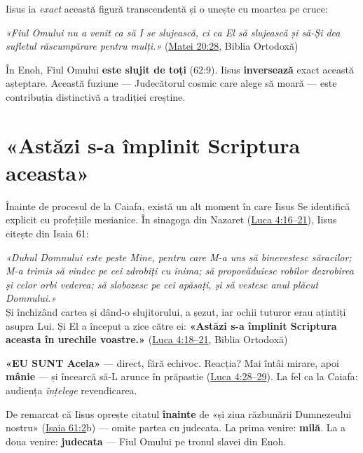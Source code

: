 \documentclass[12pt,a4paper,twoside,openany]{book}
\begin{document}
Iisus ia \textit{exact} această figură transcendentă și o unește cu moartea pe cruce:


\begin{biblequote}
\textit{«Fiul Omului nu a venit ca să I se slujească, ci ca El să slujească și să-Și dea sufletul răscumpărare pentru mulți.»} (\href{https://bibliaortodoxa.ro/carte.php?id=55\&cap=20\#28}{Matei 20:28}, Biblia Ortodoxă)
\end{biblequote}
În Enoh, Fiul Omului \textbf{este slujit de toți} (62:9). Iisus \textbf{inversează} exact această așteptare. Această fuziune — Judecătorul cosmic care alege să moară — este contribuția distinctivă a tradiției creștine.


\chapter{«Astăzi s-a împlinit Scriptura aceasta»}\label{nazaret}
Înainte de procesul de la Caiafa, există un alt moment în care Iisus Se identifică explicit cu profețiile mesianice. În sinagoga din Nazaret (\href{https://bibliaortodoxa.ro/carte.php?id=48\&cap=4\#16}{Luca 4:16–21}), Iisus citește din Isaia 61:


\begin{biblequote}
\textit{«Duhul Domnului este peste Mine, pentru care M-a uns să binevestesc săracilor; M-a trimis să vindec pe cei zdrobiți cu inima; să propovăduiesc robilor dezrobirea și celor orbi vederea; să slobozesc pe cei apăsați, și să vestesc anul plăcut Domnului.»} \\

Și închizând cartea și dând-o slujitorului, a șezut, iar ochii tuturor erau ațintiți asupra Lui. Și El a început a zice către ei: \textbf{«Astăzi s-a împlinit Scriptura aceasta în urechile voastre.»} (\href{https://bibliaortodoxa.ro/carte.php?id=48\&cap=4\#18}{Luca 4:18–21}, Biblia Ortodoxă)
\end{biblequote}
\textbf{«EU SUNT Acela»} — direct, fără echivoc. Reacția? Mai întâi mirare, apoi \textbf{mânie} — și încearcă să-L arunce în prăpastie (\href{https://bibliaortodoxa.ro/carte.php?id=48\&cap=4\#28}{Luca 4:28–29}). La fel ca la Caiafa: audiența \textit{înțelege} revendicarea.

De remarcat că Iisus oprește citatul \textbf{înainte} de «și ziua răzbunării Dumnezeului nostru» (\href{https://bibliaortodoxa.ro/carte.php?id=43\&cap=61\#2}{Isaia 61:2}b) — omite partea cu judecata. La prima venire: \textbf{milă}. La a doua venire: \textbf{judecata} — Fiul Omului pe tronul slavei din Enoh.
\end{document}
